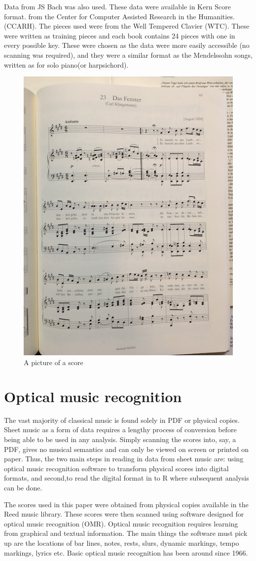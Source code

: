 \documentclass[12pt,twoside]{reedthesis}
\theoremstyle{definition}
\theoremstyle{definition}
\theoremstyle{definition}
\theoremstyle{remark}
\begin{document}
Data from JS Bach was also used. These data were available in Kern Score
format. from the Center for Computer Assisted Research in the
Humanities. (CCARH). The pieces used were from the Well Tempered Clavier
(WTC). These were written as training pieces and each book contains 24
pieces with one in every possible key. These were chosen as the data
were more easily accessible (no scanning was required), and they were a
similar format as the Mendelssohn songs, written as for solo piano(or
harpsichord).
\begin{figure}
\includegraphics[width=0.5\linewidth]{images/scorephoto} \caption{A picture of a score}\label{fig:unnamed-chunk-1}
\end{figure}
\section{Optical music recognition}\label{optical-music-recognition}

The vast majority of classical music is found solely in PDF or physical
copies. Sheet music as a form of data requires a lengthy process of
conversion before being able to be used in any analysis. Simply scanning
the scores into, say, a PDF, gives no musical semantics and can only be
viewed on screen or printed on paper. Thus, the two main steps in
reading in data from sheet music are: using optical music recognition
software to transform physical scores into digital formats, and
second,to read the digital format in to R where subsequent analysis can
be done.

The scores used in this paper were obtained from physical copies
available in the Reed music library. These scores were then scanned
using software designed for optical music recognition (OMR). Optical
music recognition requires learning from graphical and textual
information. The main things the software must pick up are the locations
of bar lines, notes, rests, slurs, dynamic markings, tempo markings,
lyrics etc. Basic optical music recognition has been around since 1966.
\end{document}
